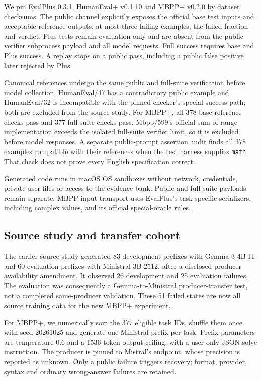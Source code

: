 \documentclass[10pt,twocolumn]{article}
\begin{document}
We pin EvalPlus 0.3.1, HumanEval+ v0.1.10 and MBPP+ v0.2.0 by dataset checksums.
The public channel explicitly exposes the official base test inputs and
acceptable reference outputs, at most three failing examples, the failed
fraction and verdict. Plus tests remain evaluation-only and are absent from the
public-verifier subprocess payload and all model requests. Full success requires
base and Plus success. A replay stops on a public pass, including a public false
positive later rejected by Plus.

Canonical references undergo the same public and full-suite verification before
model collection. HumanEval/47 has a contradictory public example and
HumanEval/32 is incompatible with the pinned checker's special success path;
both are excluded from the source study. For MBPP+, all 378 base reference
checks pass and 377 full-suite checks pass. Mbpp/599's official sum-of-range
implementation exceeds the isolated full-suite verifier limit, so it is excluded
before model responses. A separate public-prompt assertion audit finds all
378 examples compatible with their references when the test harness supplies
\texttt{math}. That check does not prove every English specification correct.

Generated code runs in macOS OS sandboxes without network, credentials,
private user files or access to the evidence bank. Public and full-suite payloads
remain separate. MBPP input transport uses EvalPlus's task-specific serializers,
including complex values, and its official special-oracle rules.

\subsection{Source study and transfer cohort}

The earlier source study generated 83 development prefixes with Gemma 3 4B IT
and 60 evaluation prefixes with Ministral 3B 2512, after a disclosed producer
availability amendment. It observed 26 development and 25 evaluation failures.
The evaluation was consequently a Gemma-to-Ministral producer-transfer test,
not a completed same-producer validation. These 51 failed states are now all
source training data for the new MBPP+ experiment.

For MBPP+, we numerically sort the 377 eligible task IDs, shuffle them once with
seed 20261025 and generate one Ministral prefix per task. Prefix parameters are
temperature 0.6 and a 1536-token output ceiling, with a user-only JSON solve
instruction. The producer is pinned to Mistral's endpoint, whose precision is
reported as unknown. Only a public failure triggers recovery; format, provider,
syntax and ordinary wrong-answer failures are retained.
\end{document}
